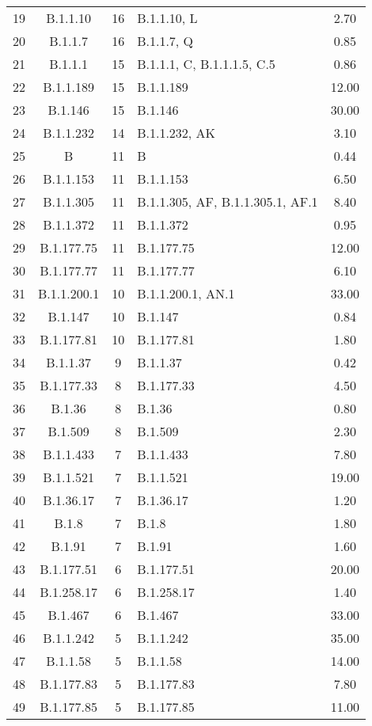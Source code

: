 \begin{longtable}[l]{cccP{4cm}c}
  19 & B.1.1.10 &  16 & B.1.1.10, L & 2.70 \\ 
  20 & B.1.1.7 &  16 & B.1.1.7, Q & 0.85 \\ 
  21 & B.1.1.1 &  15 & B.1.1.1, C, B.1.1.1.5, C.5 & 0.86 \\ 
  22 & B.1.1.189 &  15 & B.1.1.189 & 12.00 \\ 
  23 & B.1.146 &  15 & B.1.146 & 30.00 \\ 
  24 & B.1.1.232 &  14 & B.1.1.232, AK & 3.10 \\ 
  25 & B &  11 & B & 0.44 \\ 
  26 & B.1.1.153 &  11 & B.1.1.153 & 6.50 \\ 
  27 & B.1.1.305 &  11 & B.1.1.305, AF, B.1.1.305.1, AF.1 & 8.40 \\ 
  28 & B.1.1.372 &  11 & B.1.1.372 & 0.95 \\ 
  29 & B.1.177.75 &  11 & B.1.177.75 & 12.00 \\ 
  30 & B.1.177.77 &  11 & B.1.177.77 & 6.10 \\ 
  31 & B.1.1.200.1 &  10 & B.1.1.200.1, AN.1 & 33.00 \\ 
  32 & B.1.147 &  10 & B.1.147 & 0.84 \\ 
  33 & B.1.177.81 &  10 & B.1.177.81 & 1.80 \\ 
  34 & B.1.1.37 &   9 & B.1.1.37 & 0.42 \\ 
  35 & B.1.177.33 &   8 & B.1.177.33 & 4.50 \\ 
  36 & B.1.36 &   8 & B.1.36 & 0.80 \\ 
  37 & B.1.509 &   8 & B.1.509 & 2.30 \\ 
  38 & B.1.1.433 &   7 & B.1.1.433 & 7.80 \\ 
  39 & B.1.1.521 &   7 & B.1.1.521 & 19.00 \\ 
  40 & B.1.36.17 &   7 & B.1.36.17 & 1.20 \\ 
  41 & B.1.8 &   7 & B.1.8 & 1.80 \\ 
  42 & B.1.91 &   7 & B.1.91 & 1.60 \\ 
  43 & B.1.177.51 &   6 & B.1.177.51 & 20.00 \\ 
  44 & B.1.258.17 &   6 & B.1.258.17 & 1.40 \\ 
  45 & B.1.467 &   6 & B.1.467 & 33.00 \\ 
  46 & B.1.1.242 &   5 & B.1.1.242 & 35.00 \\ 
  47 & B.1.1.58 &   5 & B.1.1.58 & 14.00 \\ 
  48 & B.1.177.83 &   5 & B.1.177.83 & 7.80 \\ 
  49 & B.1.177.85 &   5 & B.1.177.85 & 11.00 \\ 

\end{longtable}
